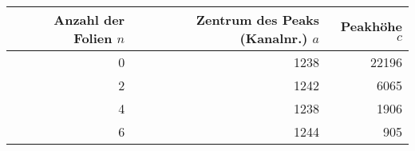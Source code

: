 \begin{tabular}{rrr}
\toprule
Anzahl der Folien $n$ & Zentrum des Peaks (Kanalnr.) $a$ & Peakhöhe $c$ \\
\midrule
0 & 1238 & 22196 \\
2 & 1242 & 6065 \\
4 & 1238 & 1906 \\
6 & 1244 & 905 \\
\bottomrule
\end{tabular}

